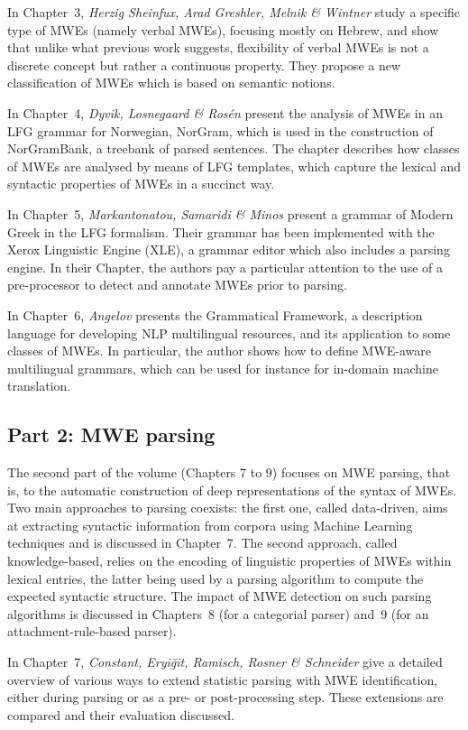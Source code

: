 \documentclass[output=paper]{langsci/langscibook}
\begin{document}
In Chapter~3, \textit{Herzig Sheinfux, Arad Greshler, Melnik \&
  Wintner} study a specific type of MWEs (namely verbal MWEs),
focusing mostly on Hebrew, and show that unlike what previous work
suggests, flexibility of verbal MWEs is not a discrete concept but
rather a continuous property. They propose a new classification of
MWEs which is based on semantic notions.

In Chapter~4, \textit{Dyvik, Losnegaard \& Rosén} present the analysis
of MWEs in an LFG grammar for Norwegian, NorGram, which is used in the
construction of NorGramBank, a treebank of parsed sentences. The
chapter describes how classes of MWEs are analysed by means of LFG
templates, which capture the lexical and syntactic properties of MWEs
in a succinct way.

In Chapter~5, \textit{Markantonatou, Samaridi \& Minos} present a
grammar of Modern Greek in the LFG formalism. Their grammar has been
implemented with the Xerox Linguistic Engine (XLE), a grammar editor
which also includes a parsing engine. In their Chapter, the authors
pay a particular attention to the use of a pre-processor to detect and
annotate MWEs prior to parsing.

In Chapter~6, \textit{Angelov} presents the Grammatical Framework, a
description language for developing NLP multilingual resources, and
its application to some classes of MWEs. In particular, the author
shows how to define MWE-aware multilingual grammars, which can be used
for instance for in-domain machine translation.

\subsection*{Part 2: MWE parsing}

The second part of the volume (Chapters 7 to 9) focuses on MWE
parsing, that is, to the automatic construction of deep
representations of the syntax of MWEs. Two main approaches to parsing
coexists: the first one, called data-driven, aims at extracting
syntactic information from corpora using Machine Learning techniques
and is discussed in Chapter~7. The second approach, called
knowledge-based, relies on the encoding of linguistic properties of
MWEs within lexical entries, the latter being used by a parsing
algorithm to compute the expected syntactic structure. The impact of
MWE detection on such parsing algorithms is discussed in Chapters~8
(for a categorial parser) and~9 (for an attachment-rule-based parser).

In Chapter~7, \textit{Constant, Eryiğit, Ramisch, Rosner \& Schneider}
give a detailed overview of various ways to extend statistic parsing
with MWE identification, either during parsing or as a pre- or
post-processing step. These extensions are compared and their
evaluation discussed.
\end{document}
